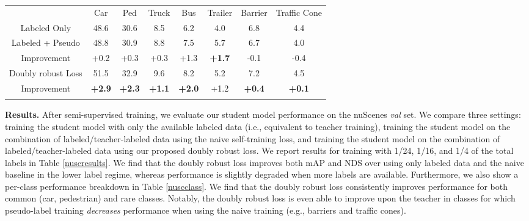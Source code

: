 \begin{table*}
\centering
\small
\setlength{\tabcolsep}{9pt}
\renewcommand\arraystretch{1.05}
\caption{Per-class mAP (\%) comparison on nuScenes \textit{val} set using 1/16 of total labels in training.}
\vspace{-0.08in}
\begin{tabular}{c||c | c | c | c | c | c | c}
\shline
 & Car & Ped & Truck & Bus & Trailer & Barrier & Traffic Cone\\
 \shline
 Labeled Only & 48.6 & 30.6 & 8.5 & 6.2 & 4.0 & 6.8 & 4.4\\
 \hline
 Labeled + Pseudo & 48.8 & 30.9 & 8.8 & 7.5 & 5.7 & 6.7 & 4.0\\
 Improvement & +0.2 & +0.3 & +0.3 & +1.3 & \textbf{+1.7} & -0.1 & -0.4\\
 \hline
 Doubly robust Loss & 51.5 & 32.9 &  9.6 & 8.2 & 5.2 & 7.2 & 4.5   \\
 Improvement & \textbf{+2.9} & \textbf{+2.3} & \textbf{+1.1}  & \textbf{+2.0} & +1.2 & \textbf{+0.4} &  \textbf{+0.1}  \\
 \shline
\end{tabular}
\label{nuscclass}
\vspace{-12pt}
\end{table*}

\textbf{Results.}
After semi-supervised training, we evaluate our student model performance on the nuScenes \textit{val} set. We compare three settings: training the student model with only the available labeled data (i.e., equivalent to teacher training), training the student model on the combination of labeled/teacher-labeled data using the naive self-training loss, and training the student model on the combination of labeled/teacher-labeled data using our proposed doubly robust loss. We report results for training with 1/24, 1/16, and 1/4 of the total labels in Table \ref{nuscresults}. We find that the doubly robust loss improves both mAP and NDS over using only labeled data and the naive baseline in the lower label regime, whereas performance is slightly degraded when more labels are available. Furthermore, we also show a per-class performance breakdown in Table \ref{nuscclass}. We find that the doubly robust loss consistently improves performance for both common (car, pedestrian) and rare classes. Notably, the doubly robust loss is even able to improve upon the teacher in classes for which pseudo-label training \textit{decreases} performance when using the naive training (e.g., barriers and traffic cones).



